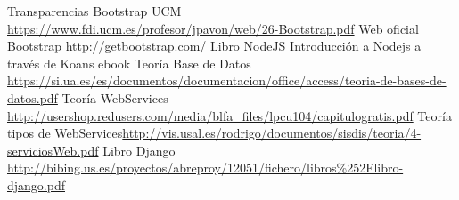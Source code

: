 \documentclass[oneside,a4paper,11pt]{book}
\begin{document}
\begin{thebibliography}{99}
 Transparencias Bootstrap UCM \url{https://www.fdi.ucm.es/profesor/jpavon/web/26-Bootstrap.pdf}
 Web oficial Bootstrap \url{http://getbootstrap.com/}
 Libro NodeJS \textnormal{Introducción a Nodejs a través de Koans ebook}
 Teoría Base de Datos \url{https://si.ua.es/es/documentos/documentacion/office/access/teoria-de-bases-de-datos.pdf}
 Teoría WebServices \url{http://usershop.redusers.com/media/blfa_files/lpcu104/capitulogratis.pdf}
 Teoría tipos de WebServices\url{http://vis.usal.es/rodrigo/documentos/sisdis/teoria/4-serviciosWeb.pdf}
 Libro Django \url{http://bibing.us.es/proyectos/abreproy/12051/fichero/libros\%252Flibro-django.pdf}
\end{thebibliography}
\end{document}
